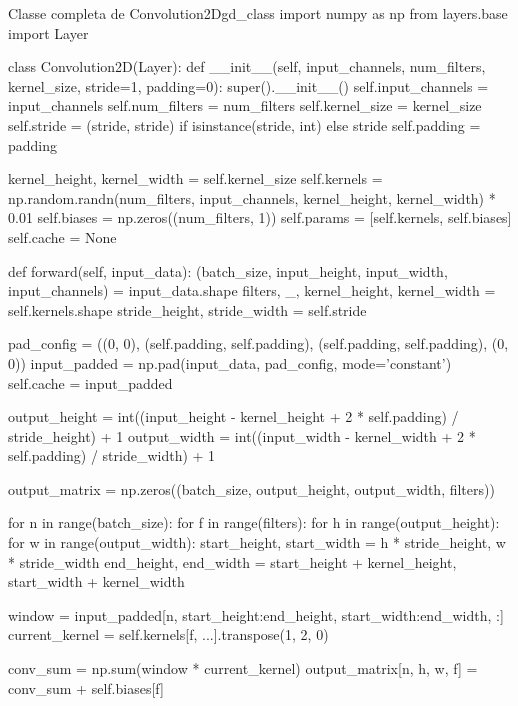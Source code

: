 \begin{codelisting}{Classe completa de Convolution2D}{gd_class}
import numpy as np
from layers.base import Layer

class Convolution2D(Layer):
    def __init__(self, input_channels, num_filters, kernel_size, stride=1, padding=0):
        super().__init__()
        self.input_channels = input_channels
        self.num_filters = num_filters
        self.kernel_size = kernel_size
        self.stride = (stride, stride) if isinstance(stride, int) else stride
        self.padding = padding

        kernel_height, kernel_width = self.kernel_size
        self.kernels = np.random.randn(num_filters, input_channels, kernel_height, kernel_width) * 0.01
        self.biases = np.zeros((num_filters, 1))
        self.params = [self.kernels, self.biases]
        self.cache = None

    def forward(self, input_data):
        (batch_size, input_height, input_width, input_channels) = input_data.shape
        filters, _, kernel_height, kernel_width = self.kernels.shape
        stride_height, stride_width = self.stride

        pad_config = ((0, 0), (self.padding, self.padding), (self.padding, self.padding), (0, 0))
        input_padded = np.pad(input_data, pad_config, mode='constant')
        self.cache = input_padded

        output_height = int((input_height - kernel_height + 2 * self.padding) / stride_height) + 1
        output_width = int((input_width - kernel_width + 2 * self.padding) / stride_width) + 1

        output_matrix = np.zeros((batch_size, output_height, output_width, filters))

        for n in range(batch_size):
            for f in range(filters):
                for h in range(output_height):
                    for w in range(output_width):
                        start_height, start_width = h * stride_height, w * stride_width
                        end_height, end_width = start_height + kernel_height, start_width + kernel_width

                        window = input_padded[n, start_height:end_height, start_width:end_width, :]
                        current_kernel = self.kernels[f, ...].transpose(1, 2, 0)

                        conv_sum = np.sum(window * current_kernel)
                        output_matrix[n, h, w, f] = conv_sum + self.biases[f]


\end{codelisting}
